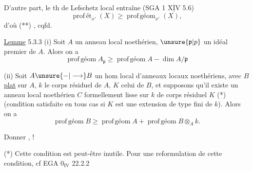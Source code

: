 
D'autre part, le th de Lefschetz local entraîne (SGA 1 $\overline{\underline{\mathrm{XIV}}}$ 5.6)
\[
\operatorname{prof\,ét}_{x'}(X)\geq\operatorname{prof\,géom}_{x'}(X),
\]
d'où  (**) , cqfd.


\uline{Lemme} 5.3.3 (i) Soit $A$ un anneau local noethérien, $\unsure{\mathfrak{p}|p}$ un idéal premier de $A$. Alors on a
\[
\operatorname{prof\,géom}A_{\mathfrak{p}}\geq\operatorname{prof\,géom}A-\dim A/\mathfrak{p}
\]

(ii) Soit $A\unsure{-|\longrightarrow}B$ un hom local d'anneaux locaux noethériens, avec $B$ \uline{plat} sur $A$, $k$ le corps résiduel de $A$, $K$ celui de $B$, et supposons qu'il existe un anneau local noethérien $C$  formellement lisse sur $k$ de corps résiduel $K$ (*) (condition satisfaite en tous cas si $K$ est une extension de type fini de $k$). Alors on a
\[
\operatorname{prof\,géom}B\geq\operatorname{prof\,géom}A+\operatorname{prof\,géom}B\otimes_A k.
\]

Donner , !

(*) Cette condition est peut-être inutile. Pour une reformulation de cette condition, cf EGA $0_{\mathrm{IV}}$ 22.2.2
